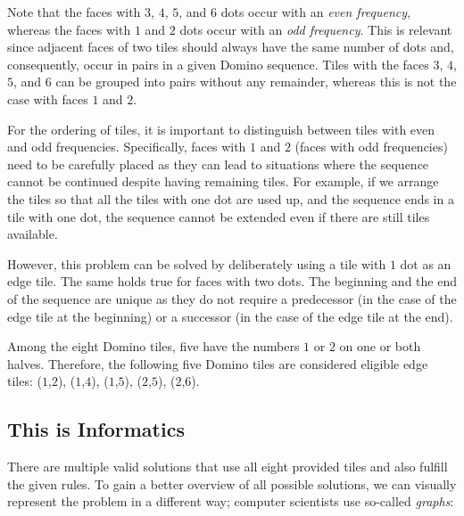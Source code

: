 \documentclass[a4paper,11pt]{report}
\newcommand{\taskGraphicsFolder}{..}
\begin{document}
Note that the faces with $3$, $4$, $5$, and $6$ dots occur with an \emph{even frequency}, whereas the faces with $1$ and $2$ dots occur with an \emph{odd frequency}. This is relevant since adjacent faces of two tiles should always have the same number of dots and, consequently, occur in pairs in a given Domino sequence. Tiles with the faces $3$, $4$, $5$, and $6$ can be grouped into pairs without any remainder, whereas this is not the case with faces $1$ and $2$.

For the ordering of tiles, it is important to distinguish between tiles with even and odd frequencies. Specifically, faces with $1$ and $2$ (faces with odd frequencies) need to be carefully placed as they can lead to situations where the sequence cannot be continued despite having remaining tiles. For example, if we arrange the tiles so that all the tiles with one dot are used up, and the sequence ends in a tile with one dot, the sequence cannot be extended even if there are still tiles available.

{\centering%
\par}

However, this problem can be solved by deliberately using a tile with $1$ dot as an edge tile. The same holds true for faces with two dots. The beginning and the end of the sequence are unique as they do not require a predecessor (in the case of the edge tile at the beginning) or a successor (in the case of the edge tile at the end).

Among the eight Domino tiles, five have the numbers $1$ or $2$ on one or both halves. Therefore, the following five Domino tiles are considered eligible edge tiles: ($1$,$2$), ($1$,$4$), ($1$,$5$), ($2$,$5$), ($2$,$6$).


\subsection*{This is Informatics}

There are multiple valid solutions that use all eight provided tiles and also fulfill the given rules. To gain a better overview of all possible solutions, we can visually represent the problem in a different way; computer scientists use so-called \emph{graphs}:

{\centering%
\par}
\end{document}
